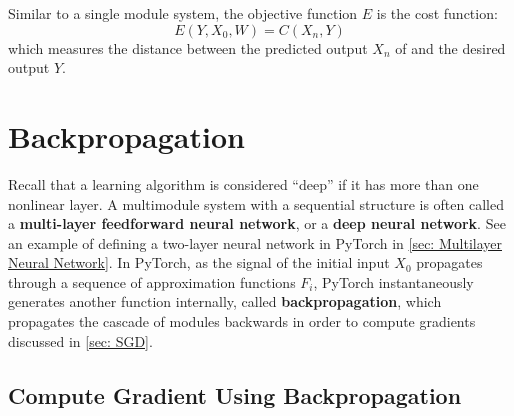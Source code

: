 Similar to a single module system, the objective function $E$ is the cost function:
\[
E(Y, X_0, W) = C(X_n, Y)
\]
which measures the distance between the predicted output $X_n$ of and the desired output $Y$. 
\section{Backpropagation}\label{sec: Backpropagation}

Recall that a learning algorithm is considered ``deep'' if it has more than one nonlinear layer.
A multimodule system with a sequential structure is often called a \textbf{multi-layer feedforward neural network}, or a \textbf{deep neural network}.
See an example of defining a two-layer neural network in PyTorch in \cref{sec: Multilayer Neural Network}.
In PyTorch, as the signal of the initial input $X_0$ propagates through a sequence of approximation functions $F_i$, PyTorch instantaneously generates another function internally, called \textbf{backpropagation}, which propagates the cascade of modules backwards in order to compute gradients discussed in \cref{sec: SGD}. 

\subsection{Compute Gradient Using Backpropagation}\label{ssc: Compute SGD using backprop}

